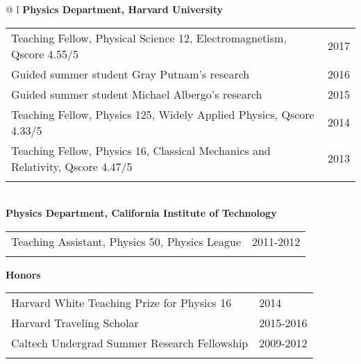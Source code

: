\documentclass[letterpaper,11pt,oneside]{article}
\begin{document}
\begin{flushleft}
\hspace{1cm}
 \begin{tabular}{@{} l}
    \textbf{Physics Department, Harvard University} \\ 
    \begin{tabular}{@{} l l }
 Teaching Fellow, Physical Science 12, Electromagnetism, Qscore 4.55/5  & 2017\\
 Guided summer student Gray Putnam's research & 2016\\
 Guided summer student Michael Albergo's research & 2015\\
 Teaching Fellow, Physics 125, Widely Applied Physics, Qscore 4.33/5  & 2014\\
 Teaching Fellow, Physics 16, Classical Mechanics and Relativity, Qscore 4.47/5 & 2013\\
    \hspace{0.8\linewidth} & \hspace{0.1\linewidth} \\
     \end{tabular}
     \\
     \textbf{Physics Department, California Institute of Technology} \\
     \begin{tabular}{@{} l l }
 Teaching Assistant, Physics 50, Physics League & 2011-2012\\
    \hspace{0.8\linewidth} & \hspace{0.1\linewidth} \\
      \end{tabular}
      \end{tabular}
\end{flushleft}
\vspace{-0.25cm}
\raggedright
 \textbf{\Large{Honors}} \\
\vspace{-0.5cm}
 \normalsize
\begin{flushleft}
\hspace{1cm}
\begin{tabular}{@{} l l }
 Harvard White Teaching Prize for Physics 16 & 2014\\
 Harvard Traveling Scholar & 2015-2016\\
 Caltech Undergrad Summer Research Fellowship & 2009-2012\\
    \hspace{0.8\linewidth} & \hspace{0.1\linewidth} \\
 \end{tabular}
\end{flushleft}
\end{document}
